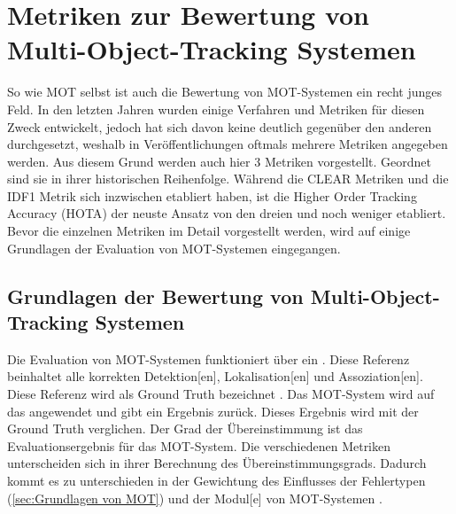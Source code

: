 \section{Metriken zur Bewertung von Multi-Object-Tracking Systemen}
So wie \gls{MOT} selbst ist auch die Bewertung von \gls{MOT}-Systemen ein recht junges Feld. In den letzten Jahren wurden einige Verfahren und Metriken für diesen Zweck entwickelt, jedoch hat sich davon keine deutlich gegenüber den anderen durchgesetzt, weshalb in Veröffentlichungen oftmals mehrere Metriken angegeben werden. Aus diesem Grund werden auch hier 3 Metriken vorgestellt. Geordnet sind sie in ihrer historischen Reihenfolge. Während die \acrshort{CLEAR} Metriken \cite{CLEAR.2008} und die IDF1 Metrik \cite{IDF1} sich inzwischen etabliert haben, ist die Higher Order Tracking Accuracy (\acrshort{HOTA}) \cite{HOTA} der neuste Ansatz von den dreien und noch weniger etabliert. Bevor die einzelnen Metriken im Detail vorgestellt werden, wird auf einige Grundlagen der Evaluation von \gls{MOT}-Systemen eingegangen.

\subsection{Grundlagen der Bewertung von Multi-Object-Tracking Systemen}
Die Evaluation von \gls{MOT}-Systemen funktioniert über ein . Diese Referenz beinhaltet alle korrekten \gls{Detektion}[en], \gls{Lokalisation}[en] und \gls{Assoziation}[en]. Diese Referenz wird als \gls{Ground Truth} bezeichnet  \cite{EMPTYCITE}. Das \gls{MOT}-System wird auf das  angewendet und gibt ein Ergebnis zurück. Dieses Ergebnis wird mit der \gls{Ground Truth} verglichen. Der Grad der Übereinstimmung ist das Evaluationsergebnis für das \gls{MOT}-System. Die verschiedenen Metriken unterscheiden sich in ihrer Berechnung des Übereinstimmungsgrads. Dadurch kommt es zu unterschieden in der Gewichtung des Einflusses der Fehlertypen (\ref{sec:Grundlagen von MOT}) und der \gls{Modul}[e] von \gls{MOT}-Systemen \cite{HOTA, IDF1, CLEAR.2008}.\par

